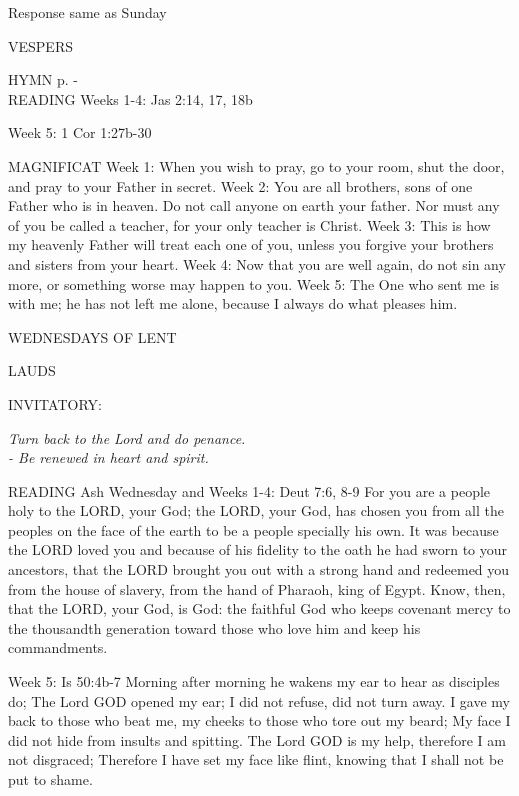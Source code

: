 Response same as Sunday

\begin{flushleft}\normalsize{\uppercase{VESPERS\\}}\end{flushleft}
\small{\uppercase{HYMN} p. \pageref{lent:firstHymn}-\pageref{lent:lastHymn}\\}
READING
Weeks 1-4:    Jas 2:14, 17, 18b

Week 5:    1 Cor 1:27b-30    

MAGNIFICAT
Week 1:	When you wish to pray, go to your room, shut the door, and pray to your Father in secret.
Week 2:	You are all brothers, sons of one Father who is in heaven. Do not call anyone on earth your father. Nor must any of you be called a teacher, for your only teacher is Christ.
Week 3:	This is how my heavenly Father will treat each one of you, unless you forgive your brothers and sisters from your heart.
Week 4:	Now that you are well again, do not sin any more, or something worse may happen to you.
Week 5:	The One who sent me is with me; he has not left me alone, because I always do what pleases him.

	\begin{center}
\normalsize WEDNESDAYS OF LENT
	\end{center}

\begin{flushleft}\normalsize{\uppercase{LAUDS\\}}\end{flushleft}
\small{\uppercase{INVITATORY:}}\normalsize
\begin{center}
\textit{Turn back to the Lord and do penance.\\}
\textit{- Be renewed in heart and spirit.\\}
\end{center}
READING
Ash Wednesday and Weeks 1-4:    Deut 7:6, 8-9    For you are a people holy to the LORD, your God; the LORD, your God, has chosen you from all the peoples on the face of the earth to be a people specially his own. It was because the LORD loved you and because of his fidelity to the oath he had sworn to your ancestors, that the LORD brought you out with a strong hand and redeemed you from the house of slavery, from the hand of Pharaoh, king of Egypt. Know, then, that the LORD, your God, is God: the faithful God who keeps covenant mercy to the thousandth generation toward those who love him and keep his commandments.

Week 5:    Is 50:4b-7    Morning after morning
he wakens my ear to hear as disciples do;
The Lord GOD opened my ear;
I did not refuse,
did not turn away.
I gave my back to those who beat me,
my cheeks to those who tore out my beard;
My face I did not hide
from insults and spitting.
The Lord GOD is my help,
therefore I am not disgraced;
Therefore I have set my face like flint,
knowing that I shall not be put to shame.

